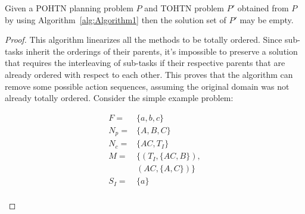 \begin{theorem}\label{thm:notCompleteness}
	Given a POHTN planning problem $P$ and TOHTN problem
	$P'$ obtained from $P$ by using Algorithm~\ref{alg:Algorithm1}
	then the solution set of $P'$ may be empty.
\end{theorem}
\begin{proof}
	This algorithm linearizes all the methods to be totally ordered. Since sub-tasks inherit the orderings of their parents, it's impossible to preserve a solution that requires the interleaving of sub-tasks if their respective parents that are already ordered with respect to each other. This proves that the algorithm can remove some possible action sequences, assuming the original domain was not already totally ordered. Consider the simple example problem:
	
	
	\begin{figure}
		\caption{Diagram showing an example problem and its decomposition.}		
		\begin{subfigure}{3.5cm}
			\begin{align*}
			F   = & \{a, b, c \}           \\
			N_p =  & \{A, B, C\}      \\
			N_c = & \{AC, T_I\}            \\ 
			M   = & \{  (T_I, \{AC, B\}), \\
			&    (AC, \{A, C\})  \} \\
			S_I = & \{ a \} 	             \\ 
			\end{align*} 
		\end{subfigure}		
\end{figure}
\end{proof}
